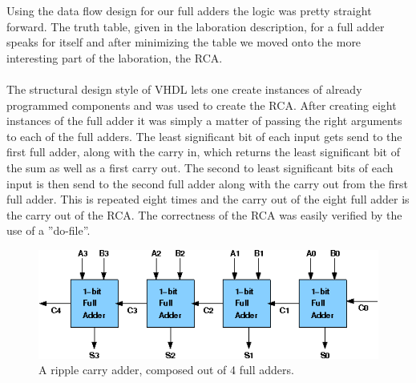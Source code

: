 \documentclass[a4paper,11pt]{article}
\begin{document}
\noindent
Using the data flow design for our full adders the logic was pretty straight 
forward. The truth table, given in the laboration description, for a full 
adder speaks for itself and after minimizing the table we moved onto the more 
interesting part of the laboration, the RCA.\\\\
\noindent
The structural design style of VHDL lets one create instances of already 
programmed components and was used to create the RCA. After creating eight 
instances of the full adder it was simply a matter of passing the right 
arguments to each of the full adders. The least significant bit of each input 
gets send to the first full adder, along with the carry in, which returns the 
least significant bit of the sum as well as a first carry out. The second to 
least significant bits of each input is then send to the second full adder 
along with the carry out from the first full adder. This is repeated eight 
times and the carry out of the eight full adder is the carry out of the RCA. 
The correctness of the RCA was easily verified by the use of a ''do-file''.

\begin{figure}[h]
    \centering
    \includegraphics[width=\linewidth]{RCA.png}
    \caption{A ripple carry adder, composed out of 4 full adders.}
    \label{RCA}
\end{figure}
\end{document}

